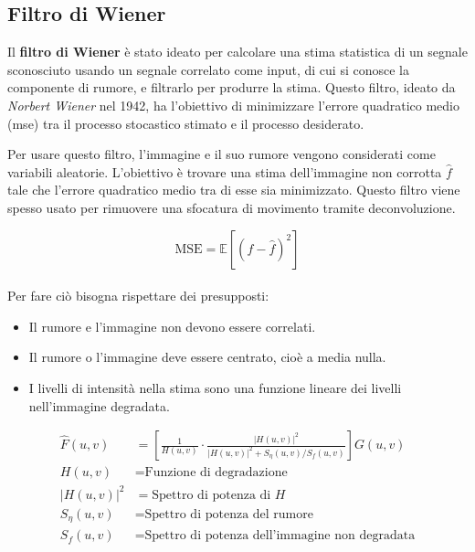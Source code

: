 \documentclass[../main.tex]{subfiles}
\begin{document}
\subsection{Filtro di Wiener}

Il \textbf{filtro di Wiener} è stato ideato per calcolare una stima statistica di un segnale sconosciuto usando un segnale correlato come input, di cui si conosce la componente di rumore, e filtrarlo per produrre la stima. Questo filtro, ideato da \textit{Norbert Wiener} nel 1942\cite{wiener_1942}, ha l'obiettivo di minimizzare l'errore quadratico medio (\acrshort{mse}) tra il processo stocastico stimato e il processo desiderato\cite{oppenheimer_2010}.

Per usare questo filtro, l'immagine e il suo rumore vengono considerati come variabili aleatorie. L'obiettivo è trovare una stima dell'immagine non corrotta $\hat{f}$ tale che l'errore quadratico medio tra di esse sia minimizzato. Questo filtro viene spesso usato per rimuovere una sfocatura di movimento tramite deconvoluzione. 

\begin{equation}
	\text{MSE} = \mathbb{E}\left[\left(f-\hat{f}\right)^2\right]
\end{equation}
\\[-10pt]
Per fare ciò bisogna rispettare dei presupposti: \cite{bergamasco_2016}

\begin{itemize}
	\itemsep0em
	\item Il rumore e l'immagine non devono essere correlati.
	\item Il rumore o l'immagine deve essere centrato, cioè a media nulla.
	\item I livelli di intensità nella stima sono una funzione lineare dei livelli nell'immagine degradata.
\end{itemize}
\begin{align}
	\hat{F}(u,v) &= \left[\frac{1}{H(u,v)}\cdot\frac{\left|H(u,v)\right|^2}{\left|H(u,v)\right|^2+S_\eta(u,v)/S_f(u,v)}\right]G(u,v)\\[5pt]
	H(u,v) &= \text{Funzione di degradazione} \nonumber \\
	\left|H(u,v)\right|^2 &= \text{Spettro di potenza di } H \nonumber \\
	S_\eta(u,v) &= \text{Spettro di potenza del rumore} \nonumber \\
	S_f(u,v) &= \text{Spettro di potenza dell'immagine non degradata} \nonumber 
\end{align}
\end{document}
